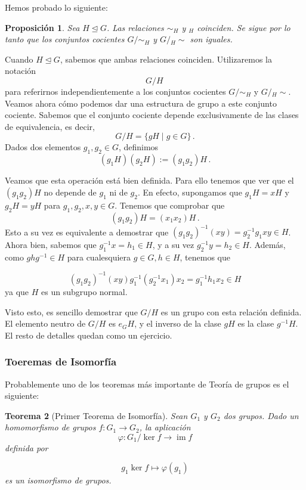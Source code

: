 \documentclass[a4paper,11pt]{amsart}
\DeclareMathOperator{\im}{im}
\theoremstyle{plain}
\newtheorem{thm}{Teorema}[section]
\newtheorem{prop}[thm]{Proposición}
\theoremstyle{definition}
\theoremstyle{remark}
\begin{document}
Hemos probado lo siguiente: 

\begin{prop}
Sea $H \trianglelefteq G$. Las relaciones $\sim_H$ y ${}_H$ coinciden. Se sigue por lo tanto que los conjuntos cocientes $G/ \sim_H$ y $G/{}_H \sim$ son iguales.
\end{prop}

Cuando $H \trianglelefteq G$, sabemos que ambas relaciones coinciden. Utilizaremos la notación 
\[ G/H \,  \]
para referirnos independientemente a los conjuntos cocientes $G/\sim_H$ y $G/{}_H \sim$. Veamos ahora cómo podemos dar una estructura de grupo a este conjunto cociente. Sabemos que el conjunto cociente depende exclusivamente de las clases de equivalencia, es decir, 
\[ G/H = \{ gH \mid g \in G\} \, .\]
Dados dos elementos $g_1, g_2 \in G$, definimos 
\[ (g_1H)(g_2H) := (g_1g_2) H \, . \]

Veamos que esta operación está bien definida. Para ello tenemos que ver que el $(g_1g_2)H$ no depende de $g_1$ ni de $g_2$. En efecto, supongamos que $g_1H = xH$ y $g_2H = yH$ para $g_1, g_2, x, y \in G$. Tenemos que comprobar que 
\[ (g_1g_2)H = (x_1x_2)H \, .\]
Esto a su vez es equivalente a demostrar que $(g_1g_2)^{-1}(xy) = g_2^{-1}g_1 xy \in H$. Ahora bien, sabemos que $g_1^{-1}x = h_1 \in H$, y a su vez $g_2^{-1}y = h_2 \in H$. Además, como $g h g^{-1} \in H$ para cualesquiera $g \in G, h \in H$, tenemos que 


\[ (g_1g_2)^{-1}(xy) g_1^{-1} (g_2^{-1} x_1) x_2 = g_1^{-1} h_1 x_2  \in H\]
ya que $H$ es un subgrupo normal.

Visto esto, es sencillo demostrar que $G/H$ es un grupo con esta relación definida. El elemento neutro de $G/H$ es $e_G H$, y el inverso de la clase $gH$ es la clase $g^{-1}H$. El resto de detalles quedan como un ejercicio.


\subsubsection{Toeremas de Isomorfía}

Probablemente uno de los teoremas más importante de Teoría de grupos es el siguiente: 

\begin{thm}[Primer Teorema de Isomorfía]
Sean $G_1$ y $G_2$ dos grupos. Dado un homomorfismo de grupos $f \colon G_1 \to G_2$, la aplicación 
\[\varphi \colon G_1 / \ker f \to \im f\]
definida por 

\[g_1 \ker f \mapsto \varphi(g_1) \]
es un isomorfismo de grupos. 
\end{thm}
\end{document}
